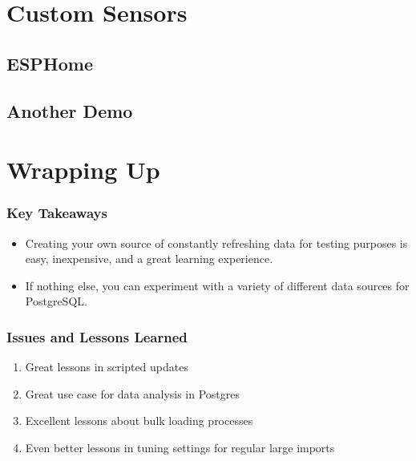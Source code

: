 \documentclass[aspectratio=169]{beamer}
\begin{document}
\section{Custom Sensors}
\frame{\sectionpage}
\subsection{ESPHome}
\frame{\subsectionpage}

\subsection{Another Demo}

\section{Wrapping Up}
\frame{\sectionpage}

\begin{frame}
  \frametitle{Key Takeaways}
  \begin{itemize}[<+->]
    \item{Creating your own source of constantly refreshing data for testing purposes is easy, inexpensive, and a great learning experience.}
    \item{If nothing else, you can experiment with a variety of different data sources for PostgreSQL.}
  \end{itemize}
\end{frame}

\begin{frame}[fragile]
  \frametitle{Issues and Lessons Learned}
  \begin{enumerate}
    \item{Great lessons in scripted updates}
    \item{Great use case for data analysis in Postgres}
    \item{Excellent lessons about bulk loading processes}
    \item{Even better lessons in tuning settings for regular large imports}
  \end{enumerate}
\end{frame}
\end{document}
